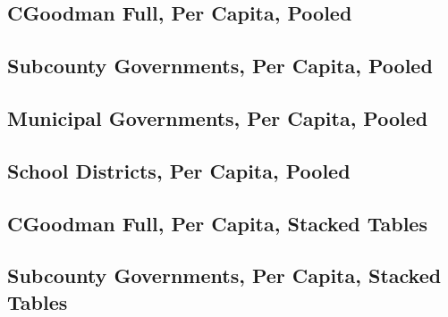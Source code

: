 \documentclass{article}
\begin{document}
{	\subsection{CGoodman Full, Per Capita, Pooled}
	
	
	\clearpage
	
	\clearpage
	
	
	\subsection{Subcounty Governments, Per Capita, Pooled}
	
	
	\clearpage
	
	\clearpage
	
	
	\subsection{Municipal Governments, Per Capita, Pooled}
	
	
	\clearpage
	
	
	\subsection{School Districts, Per Capita, Pooled}
	
	
	\clearpage
	
	\clearpage
	
	
	\subsection{CGoodman Full, Per Capita, Stacked Tables}
	
	
	\clearpage
	
	\clearpage


	
	\subsection{Subcounty Governments, Per Capita, Stacked Tables}
	
	
	\clearpage
	
	\clearpage
	
}
\end{document}
